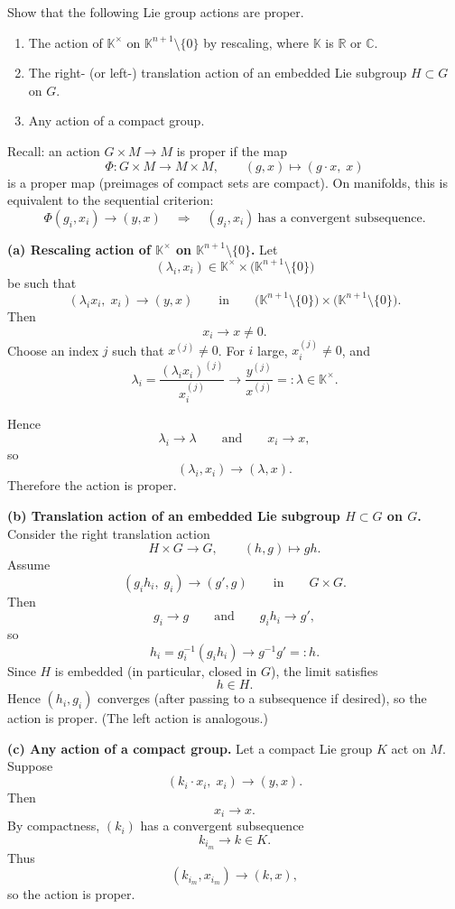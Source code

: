 \begin{problem}
\label{prob:cp-vii-0015}
Show that the following Lie group actions are proper.
\begin{enumerate}
	\item The action of $\mathbb{K}^\times$ on $\mathbb{K}^{n+1}\setminus\{0\}$ by rescaling, where $\mathbb{K}$ is $\mathbb{R}$ or $\mathbb{C}$.
	\item The right- (or left-) translation action of an embedded Lie subgroup $H\subset G$ on $G$.
	\item Any action of a compact group.
\end{enumerate}
\end{problem}

\begin{solution}
Recall: an action $G\times M\to M$ is proper if the map
\[
\Phi: G\times M \longrightarrow M\times M,
\qquad
(g,x)\longmapsto (g\cdot x,\;x)
\]
is a proper map (preimages of compact sets are compact). On manifolds, this is equivalent to the sequential criterion:
\[
\Phi(g_i,x_i)\to (y,x)
\quad\Longrightarrow\quad
(g_i,x_i)\ \text{has a convergent subsequence.}
\]

\textbf{(a) Rescaling action of $\mathbb{K}^\times$ on $\mathbb{K}^{n+1}\setminus\{0\}$.}
Let
\[
(\lambda_i,x_i)\in \mathbb{K}^\times \times \bigl(\mathbb{K}^{n+1}\setminus\{0\}\bigr)
\]
be such that
\[
(\lambda_i x_i,\;x_i)\longrightarrow (y,x)
\qquad\text{in}\qquad
\bigl(\mathbb{K}^{n+1}\setminus\{0\}\bigr)\times\bigl(\mathbb{K}^{n+1}\setminus\{0\}\bigr).
\]
Then
\[
x_i\to x\neq 0.
\]
Choose an index $j$ such that $x^{(j)}\neq 0$. For $i$ large, $x_i^{(j)}\neq 0$, and
\[
\lambda_i
=
\frac{(\lambda_i x_i)^{(j)}}{x_i^{(j)}}
\longrightarrow
\frac{y^{(j)}}{x^{(j)}}
=:\lambda
\in \mathbb{K}^\times.
\]

Hence
\[
\lambda_i\to \lambda
\qquad\text{and}\qquad
x_i\to x,
\]
so
\[
(\lambda_i,x_i)\to (\lambda,x).
\]
Therefore the action is proper.

\textbf{(b) Translation action of an embedded Lie subgroup $H\subset G$ on $G$.}
Consider the right translation action
\[
H\times G\longrightarrow G,
\qquad
(h,g)\longmapsto g h.
\]
Assume
\[
(g_i h_i,\;g_i)\longrightarrow (g',g)
\qquad\text{in}\qquad
G\times G.
\]
Then
\[
g_i\to g
\qquad\text{and}\qquad
g_i h_i\to g',
\]
so
\[
h_i
=
g_i^{-1}(g_i h_i)
\longrightarrow
g^{-1}g'
=:h.
\]
Since $H$ is embedded (in particular, closed in $G$), the limit satisfies
\[
h\in H.
\]
Hence $(h_i,g_i)$ converges (after passing to a subsequence if desired), so the action is proper. (The left action is analogous.)

\textbf{(c) Any action of a compact group.}
Let a compact Lie group $K$ act on $M$. Suppose
\[
(k_i\cdot x_i,\;x_i)\longrightarrow (y,x).
\]
Then
\[
x_i\to x.
\]
By compactness, $(k_i)$ has a convergent subsequence
\[
k_{i_m}\to k\in K.
\]
Thus
\[
(k_{i_m},x_{i_m})\to (k,x),
\]
so the action is proper.
\end{solution}

